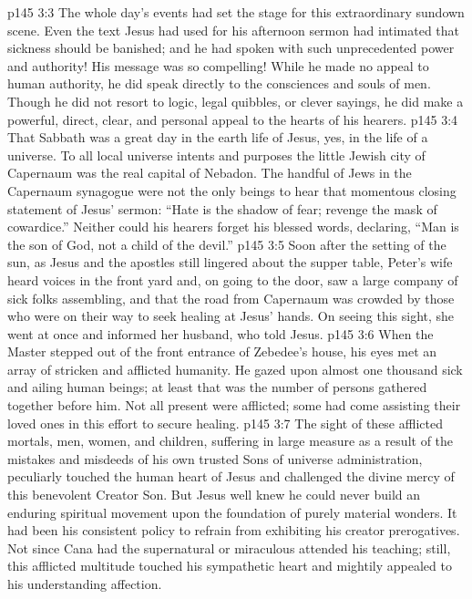 \vs p145 3:3 The whole day’s events had set the stage for this extraordinary sundown scene. Even the text Jesus had used for his afternoon sermon had intimated that sickness should be banished; and he had spoken with such unprecedented power and authority! His message was so compelling! While he made no appeal to human authority, he did speak directly to the consciences and souls of men. Though he did not resort to logic, legal quibbles, or clever sayings, he did make a powerful, direct, clear, and personal appeal to the hearts of his hearers.
\pc \vs p145 3:4 That Sabbath was a great day in the earth life of Jesus, yes, in the life of a universe. To all local universe intents and purposes the little Jewish city of Capernaum was the real capital of Nebadon. The handful of Jews in the Capernaum synagogue were not the only beings to hear that momentous closing statement of Jesus’ sermon: \textcolor{ubdarkred}{“Hate is the shadow of fear; revenge the mask of cowardice.”} Neither could his hearers forget his blessed words, declaring, \textcolor{ubdarkred}{“Man is the son of God, not a child of the devil.”}
\pc \vs p145 3:5 Soon after the setting of the sun, as Jesus and the apostles still lingered about the supper table, Peter’s wife heard voices in the front yard and, on going to the door, saw a large company of sick folks assembling, and that the road from Capernaum was crowded by those who were on their way to seek healing at Jesus’ hands. On seeing this sight, she went at once and informed her husband, who told Jesus.
\vs p145 3:6 When the Master stepped out of the front entrance of Zebedee’s house, his eyes met an array of stricken and afflicted humanity. He gazed upon almost one thousand sick and ailing human beings; at least that was the number of persons gathered together before him. Not all present were afflicted; some had come assisting their loved ones in this effort to secure healing.
\vs p145 3:7 The sight of these afflicted mortals, men, women, and children, suffering in large measure as a result of the mistakes and misdeeds of his own trusted Sons of universe administration, peculiarly touched the human heart of Jesus and challenged the divine mercy of this benevolent Creator Son. But Jesus well knew he could never build an enduring spiritual movement upon the foundation of purely material wonders. It had been his consistent policy to refrain from exhibiting his creator prerogatives. Not since Cana had the supernatural or miraculous attended his teaching; still, this afflicted multitude touched his sympathetic heart and mightily appealed to his understanding affection.
